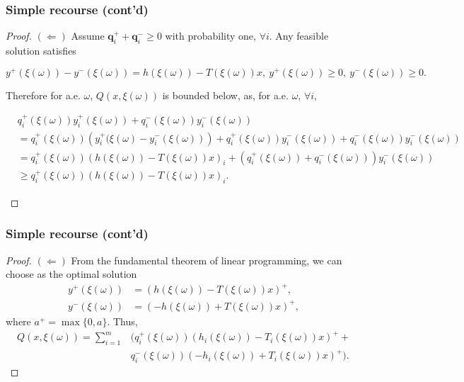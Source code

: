 \documentclass{beamer}
\begin{document}
\begin{frame}
\frametitle{Simple recourse (cont'd)}
	
\begin{proof}

{\bf $(\Leftarrow)$}
Assume $\boldsymbol{q}_i^+ + \boldsymbol{q}_i^- \geq 0$ with probability one, $\forall i$.
Any feasible solution satisfies
\begin{small}
$$
y^+(\xi(\omega))-y^-(\xi(\omega))=h(\xi(\omega))-T(\xi(\omega))x,\ 
y^+(\xi(\omega)) \geq 0,\ y^-(\xi(\omega)) \geq 0.
$$
\end{small}
Therefore for a.e. $\omega$, $Q(x,\xi(\omega))$ is bounded below, as, for a.e. $\omega$, $\forall i$,
\begin{small}
\begin{align*}
& q_i^+(\xi(\omega))y_i^+(\xi(\omega)) + q_i^-(\xi(\omega))y_i^-(\xi(\omega)) \\
& = q_i^+(\xi(\omega))\left( y_i^+(\xi(\omega) - y_i^-(\xi(\omega)) \right) + q_i^+(\xi(\omega))y_i^-(\xi(\omega)) + q_i^-(\xi(\omega))y_i^-(\xi(\omega)) \\
& = q_i^+(\xi(\omega))\left( h(\xi(\omega))-T(\xi(\omega))x \right)_i + \left( q_i^+(\xi(\omega)) + q_i^-(\xi(\omega)) \right) y_i^-(\xi(\omega)) \\
& \geq q_i^+(\xi(\omega))\left( h(\xi(\omega))-T(\xi(\omega))x \right)_i.
\end{align*}
\end{small}
\end{proof}

\end{frame}

\begin{frame}
\frametitle{Simple recourse (cont'd)}

\begin{proof}
{\bf $(\Leftarrow)$}
From the fundamental theorem of linear programming, we can choose as the optimal solution
\begin{align*}
	y^+(\xi(\omega)) &= \left(h(\xi(\omega))-T(\xi(\omega))x\right)^+,\\
	y^-(\xi(\omega)) &= \left(-h(\xi(\omega))+T(\xi(\omega))x\right)^+,
\end{align*}
where $a^+ = \max\{0, a\}$. Thus,
\begin{align*}
Q(x,\xi(\omega)) = \sum_{i=1}^{m} & (q_i^+(\xi(\omega))(h_i(\xi(\omega))-T_i(\xi(\omega))x)^+ + \\
& q_i^-(\xi(\omega))(-h_i(\xi(\omega))+T_i(\xi(\omega))x)^+ ).
\end{align*}
\end{proof}

\end{frame}
\end{document}
